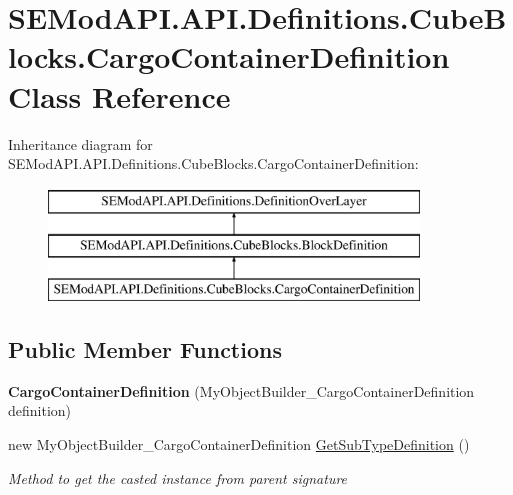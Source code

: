 \hypertarget{class_s_e_mod_a_p_i_1_1_a_p_i_1_1_definitions_1_1_cube_blocks_1_1_cargo_container_definition}{}\section{S\+E\+Mod\+A\+P\+I.\+A\+P\+I.\+Definitions.\+Cube\+Blocks.\+Cargo\+Container\+Definition Class Reference}
\label{class_s_e_mod_a_p_i_1_1_a_p_i_1_1_definitions_1_1_cube_blocks_1_1_cargo_container_definition}
Inheritance diagram for S\+E\+Mod\+A\+P\+I.\+A\+P\+I.\+Definitions.\+Cube\+Blocks.\+Cargo\+Container\+Definition\+:\begin{figure}[H]
\begin{center}
\leavevmode
\includegraphics[height=3.000000cm]{class_s_e_mod_a_p_i_1_1_a_p_i_1_1_definitions_1_1_cube_blocks_1_1_cargo_container_definition}
\end{center}
\end{figure}
\subsection*{Public Member Functions}
\begin{DoxyCompactItemize}
\item 
\hypertarget{class_s_e_mod_a_p_i_1_1_a_p_i_1_1_definitions_1_1_cube_blocks_1_1_cargo_container_definition_a89a1aa43a298bebfcd168889edd3aa68}{}{\bfseries Cargo\+Container\+Definition} (My\+Object\+Builder\+\_\+\+Cargo\+Container\+Definition definition)\label{class_s_e_mod_a_p_i_1_1_a_p_i_1_1_definitions_1_1_cube_blocks_1_1_cargo_container_definition_a89a1aa43a298bebfcd168889edd3aa68}

\item 
new My\+Object\+Builder\+\_\+\+Cargo\+Container\+Definition \hyperlink{class_s_e_mod_a_p_i_1_1_a_p_i_1_1_definitions_1_1_cube_blocks_1_1_cargo_container_definition_ad653ff27db090fdba05d142916591a8c}{Get\+Sub\+Type\+Definition} ()
\begin{DoxyCompactList}\small\item\em Method to get the casted instance from parent signature \end{DoxyCompactList}\end{DoxyCompactItemize}
